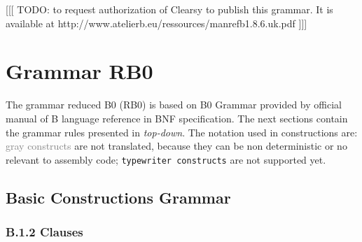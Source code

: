 \documentclass[12pt,a4paper,draft]{article}
\begin{document}


[[[ TODO: to request authorization of Clearsy to publish this grammar. It is available at http://www.atelierb.eu/ressources/manrefb1.8.6.uk.pdf ]]]

\section{ Grammar RB0}
The grammar reduced B0 (RB0)  is based on B0 Grammar  provided by official manual of B language reference in BNF specification. 
The next sections contain the grammar rules presented in \textit{top-down}. 
The notation used in constructions are:
\textcolor{gray}{gray constructs} are not translated, because they can be non deterministic or  no relevant to assembly code;
\texttt{typewriter constructs} are  not supported yet.

\subsection{Basic Constructions Grammar}

\subsubsection{B.1.2 Clauses}
\end{document}
